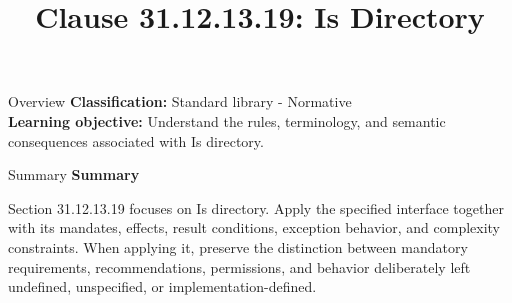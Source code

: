 \documentclass[10pt,letterpaper]{article}
\title{Clause 31.12.13.19: Is Directory}
\author{}
\date{}
\begin{document}
\maketitle
\begin{CornellOverviewBox}{Overview}
\textbf{Classification:} Standard library - Normative\\[2pt]
\textbf{Learning objective:} Understand the rules, terminology, and semantic consequences associated with Is directory.
\end{CornellOverviewBox}\begin{CornellSummaryBox}{Summary}
{\sffamily\bfseries\color{Accent} Summary}\par\vspace{3pt}Section 31.12.13.19 focuses on Is directory. Apply the specified interface together with its mandates, effects, result conditions, exception behavior, and complexity constraints. When applying it, preserve the distinction between mandatory requirements, recommendations, permissions, and behavior deliberately left undefined, unspecified, or implementation-defined.
\end{CornellSummaryBox}
\end{document}
